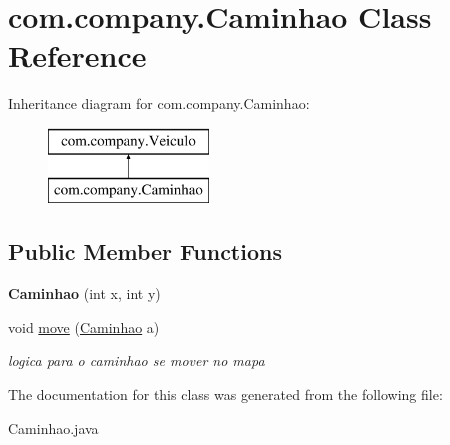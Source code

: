 \hypertarget{classcom_1_1company_1_1_caminhao}{}\section{com.\+company.\+Caminhao Class Reference}
\label{classcom_1_1company_1_1_caminhao}
Inheritance diagram for com.\+company.\+Caminhao\+:\begin{figure}[H]
\begin{center}
\leavevmode
\includegraphics[height=2.000000cm]{classcom_1_1company_1_1_caminhao}
\end{center}
\end{figure}
\subsection*{Public Member Functions}
\begin{DoxyCompactItemize}
\item 
\mbox{\label{classcom_1_1company_1_1_caminhao_ae170d22b1de70887d19e62b1c5bf9c13}} 
{\bfseries Caminhao} (int x, int y)
\item 
\mbox{\label{classcom_1_1company_1_1_caminhao_acee8e3ca4f4c8659fdfc8bfb527a3273}} 
void \mbox{\hyperlink{classcom_1_1company_1_1_caminhao_acee8e3ca4f4c8659fdfc8bfb527a3273}{move}} (\mbox{\hyperlink{classcom_1_1company_1_1_caminhao}{Caminhao}} a)
\begin{DoxyCompactList}\small\item\em logica para o caminhao se mover no mapa \end{DoxyCompactList}\end{DoxyCompactItemize}


The documentation for this class was generated from the following file\+:\begin{DoxyCompactItemize}
\item 
Caminhao.\+java\end{DoxyCompactItemize}
